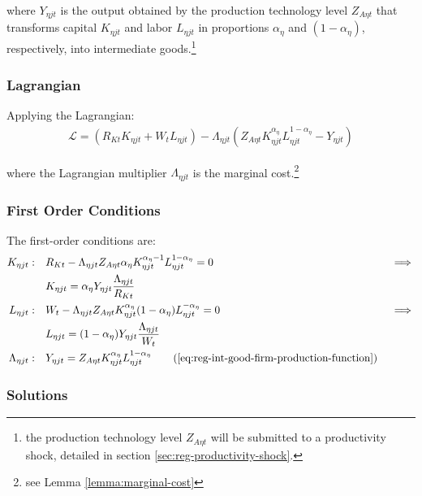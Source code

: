\documentclass[
thesis.tex
]{subfiles}
\begin{document}
where $Y_{\eta jt}$ is the output obtained by the production technology level $Z_{A\eta t}$ that transforms capital $K_{\eta jt}$ and labor $L_{\eta jt}$ in proportions ${\alpha_\eta}$ and $(1-{\alpha_\eta})$, respectively, into intermediate goods.\footnote{the production technology level $Z_{A\eta t}$ will be submitted to a productivity shock, detailed in section \ref{sec:reg-productivity-shock}.}

\subsubsection*{Lagrangian}

Applying the Lagrangian:
\begin{align}
	\label{eq:reg-int-good-firm-lagrangian}
	\mathcal{L} = (R_{Kt} K_{\eta jt} + W_t L_{\eta jt}) - \Lambda_{\eta jt} (Z_{A\eta t} K_{\eta jt}^{\alpha_\eta} L_{\eta jt}^{1-{\alpha_\eta}} - Y_{\eta jt})
\end{align}

where the Lagrangian multiplier $\Lambda_{\eta jt}$ is the marginal cost.\footnote{see Lemma \ref{lemma:marginal-cost}}

\subsubsection*{First Order Conditions}

The first-order conditions are:
\begin{alignat}{2}
	K_{\eta jt}: \quad & R_{Kt} - \Lambda_{\eta jt} Z_{A\eta t} {\alpha_\eta} K_{\eta jt}^{{\alpha_\eta}-1} L_{\eta jt}^{1-{\alpha_\eta}} = 0 &&\implies \nonumber \\
	& K_{\eta jt} = {\alpha_\eta} Y_{\eta jt} \frac{\Lambda_{\eta jt}}{R_{Kt}} \label{eq:reg-int-good-firm-FOC-Kt} \\
	L_{\eta jt}: \quad & W_t - \Lambda_{\eta jt} Z_{A\eta t} K_{\eta jt}^{\alpha_\eta} (1-{\alpha_\eta}) L_{\eta jt}^{-{\alpha_\eta}} = 0 \quad &&\implies \nonumber \\ 
	& L_{\eta jt} = (1-{\alpha_\eta}) Y_{\eta jt} \frac{\Lambda_{\eta jt}}{W_t} \label{eq:reg-int-good-firm-FOC-Lt} \\
	\Lambda_{\eta jt}: \quad & Y_{\eta jt} = Z_{A\eta t} K_{\eta jt}^{\alpha_\eta} L_{\eta jt}^{1-{\alpha_\eta}} \tag{\ref{eq:reg-int-good-firm-production-function}}
\end{alignat}

\subsubsection*{Solutions}
\end{document}
